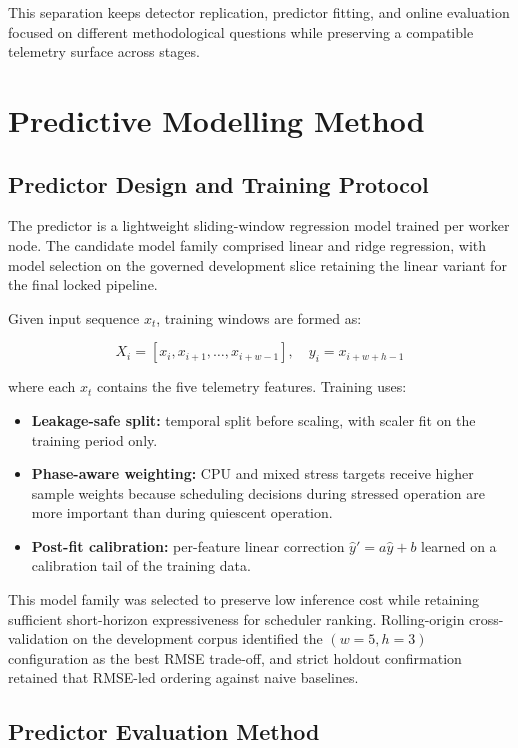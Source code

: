 This separation keeps detector replication, predictor fitting, and online evaluation focused on different methodological questions while preserving a compatible telemetry surface across stages.

\section{Predictive Modelling Method}

\subsection{Predictor Design and Training Protocol}
\label{sec:predictor-design}

The predictor is a lightweight sliding-window regression model trained per worker node. The candidate model family comprised linear and ridge regression, with model selection on the governed development slice retaining the linear variant for the final locked pipeline.

Given input sequence \(x_t\), training windows are formed as:

\[
X_i = [x_i, x_{i+1}, \dots, x_{i+w-1}], \quad y_i = x_{i+w+h-1}
\]

where each \(x_t\) contains the five telemetry features. Training uses:

\begin{itemize}
\item \textbf{Leakage-safe split:} temporal split before scaling, with scaler fit on the training period only.
\item \textbf{Phase-aware weighting:} CPU and mixed stress targets receive higher sample weights because scheduling decisions during stressed operation are more important than during quiescent operation.
\item \textbf{Post-fit calibration:} per-feature linear correction \(\hat{y}' = a\hat{y} + b\) learned on a calibration tail of the training data.
\end{itemize}

This model family was selected to preserve low inference cost while retaining sufficient short-horizon expressiveness for scheduler ranking. Rolling-origin cross-validation on the development corpus identified the \((w{=}5, h{=}3)\) configuration as the best RMSE trade-off, and strict holdout confirmation retained that RMSE-led ordering against naive baselines.


\subsection{Predictor Evaluation Method}

